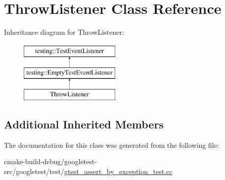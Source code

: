 \hypertarget{classThrowListener}{}\section{Throw\+Listener Class Reference}
\label{classThrowListener}
Inheritance diagram for Throw\+Listener\+:\begin{figure}[H]
\begin{center}
\leavevmode
\includegraphics[height=3.000000cm]{classThrowListener}
\end{center}
\end{figure}
\subsection*{Additional Inherited Members}


The documentation for this class was generated from the following file\+:\begin{DoxyCompactItemize}
\item 
cmake-\/build-\/debug/googletest-\/src/googletest/test/\mbox{\hyperlink{gtest__assert__by__exception__test_8cc}{gtest\+\_\+assert\+\_\+by\+\_\+exception\+\_\+test.\+cc}}\end{DoxyCompactItemize}
